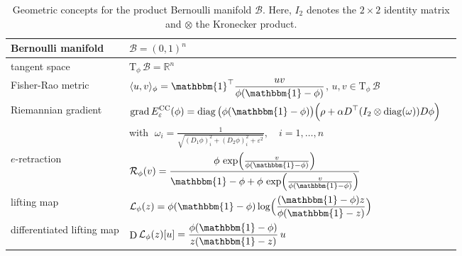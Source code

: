 \documentclass[11pt,reqno]{amsart}
\theoremstyle{plain}
\newcommand\R{\mathbb R}
\DeclareMathOperator{\Drm}{D}
\DeclareMathOperator{\grad}{grad}
\DeclareMathOperator{\diag}{diag}
\def\onebb{\mathbbm{1}}
\newcommand\calB{\mathcal B}
\newcommand{\Tan}{\mathrm{T}}
\newcommand{\Ret}{\mathcal R}
\newcommand{\invRet}{\mathcal L}
\newcommand{\CC}{{\rm CC}}
\begin{document}
		\begin{table}
			\begin{tabular}{lll}
				\toprule
				Bernoulli manifold &
				$\calB=(0,1)^n$
				\tabularnewline
				\midrule
				tangent space &
				$\displaystyle \Tan_\phi\, \calB=\R^n$ 
				\tabularnewline
				\midrule
				Fisher-Rao metric & $\langle u,v\rangle_\phi= \displaystyle{\onebb^\top \frac{u v}{\phi(\onebb-\phi)}}$, \; $u,v\in\Tan_\phi\,\calB$ 
				\tabularnewline
				\midrule
				Riemannian gradient&
				$\displaystyle
				\grad E^{\CC}_\varepsilon(\phi)
				=
				\diag\big(\phi(\onebb-\phi)\big) 
				\Big( \rho + \alpha D^\top ( I_2 \otimes \diag(\omega) ) D \phi \Big) 
				$
				\tabularnewline
				& with $\;
				\omega_i = \frac{1}{\sqrt{(D_1\phi)_i^2 + (D_2\phi)_i^2 + \varepsilon^2}}, \quad i = 1, \dots, n$
				\tabularnewline
				\midrule
				$e$-retraction &
				$\displaystyle 
				\Ret_\phi(v)
				=\frac{\phi\,\exp\!\Big(\frac{v}{\phi(\onebb-\phi)}\Big)}
				{\onebb-\phi+\phi\,\exp\!\Big(\frac{v}{\phi(\onebb-\phi)}\Big)}$
				\tabularnewline
				\midrule
				lifting map &
				$\displaystyle 
				\invRet_\phi(z)
				=\phi(\onebb-\phi)
				\log\!\Big(\frac{(\onebb-\phi)z}{\phi(\onebb-z)}\Big)$
				\tabularnewline
				\midrule
				differentiated lifting map &
				$\displaystyle 
				\Drm\invRet_\phi(z)[u]
				=\frac{\phi
					(\onebb-\phi)}{z(\onebb-z)}\,u$
				\tabularnewline
				\bottomrule
			\end{tabular}
			\caption{Geometric concepts for the product Bernoulli manifold $\calB$. Here, $I_2$ denotes the $2\times2$ identity matrix and $\otimes$ the Kronecker product.} 
			\label{tab:Bernoulli} 
		\end{table}
		
\end{document}
